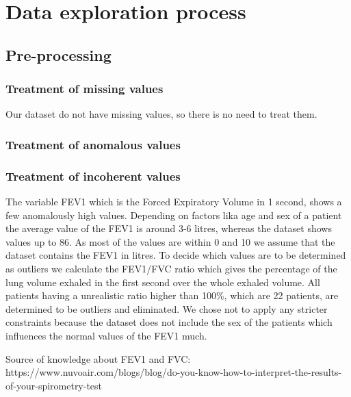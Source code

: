 

\section{Data exploration process}

\subsection{Pre-processing}
\subsubsection{Treatment of missing values}
Our dataset do not have missing values, so there is no need to treat them.
\subsubsection{Treatment of anomalous values}
\subsubsection{Treatment of incoherent values}
The variable FEV1 which is the Forced Expiratory Volume in 1 second, shows a few anomalously high values. Depending on factors lika age and sex of a patient the average value of the FEV1 is around 3-6 litres, whereas the dataset shows values up to 86. As most of the values are within 0 and 10 we assume that the dataset contains the FEV1 in litres. To decide which values are to be determined as outliers we calculate the FEV1/FVC ratio which gives the percentage of the lung volume exhaled in the first second over the whole exhaled volume. All patients having a unrealistic ratio higher than 100\%, which are 22 patients, are determined to be outliers and eliminated. We chose not to apply any stricter constraints because the dataset does not include the sex of the patients which influences the normal values of the FEV1 much.

Source of knowledge about FEV1 and FVC:
https://www.nuvoair.com/blogs/blog/do-you-know-how-to-interpret-the-results-of-your-spirometry-test


